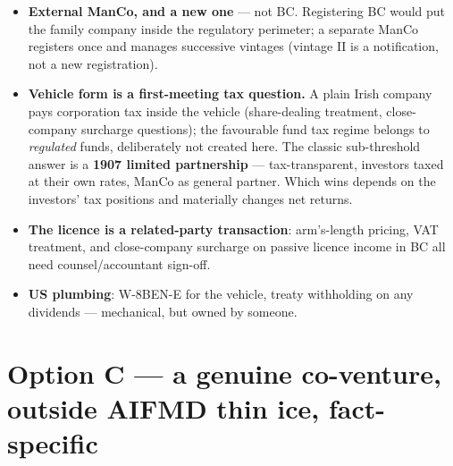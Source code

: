 \documentclass[11pt,a4paper]{article}
\begin{document}
\begin{itemize}[leftmargin=1.6em, itemsep=2pt]
\item \textbf{External ManCo, and a new one} --- not BC. Registering BC would
      put the family company inside the regulatory perimeter; a separate
      ManCo registers once and manages successive vintages (vintage II is a
      notification, not a new registration).
\item \textbf{Vehicle form is a first-meeting tax question.} A plain Irish
      company pays corporation tax inside the vehicle (share-dealing
      treatment, close-company surcharge questions); the favourable fund tax
      regime belongs to \emph{regulated} funds, deliberately not created
      here. The classic sub-threshold answer is a \textbf{1907 limited
      partnership} --- tax-transparent, investors taxed at their own rates,
      ManCo as general partner. Which wins depends on the investors' tax
      positions and materially changes net returns.
\item \textbf{The licence is a related-party transaction}: arm's-length
      pricing, VAT treatment, and close-company surcharge on passive licence
      income in BC all need counsel/accountant sign-off.
\item \textbf{US plumbing}: W-8BEN-E for the vehicle, treaty withholding on
      any dividends --- mechanical, but owned by someone.
\end{itemize}

\section{Option C --- a genuine co-venture, outside AIFMD \hfill
  {\normalsize\color{bcgrey} thin ice, fact-specific}}

\begin{center}
\end{center}
\end{document}
